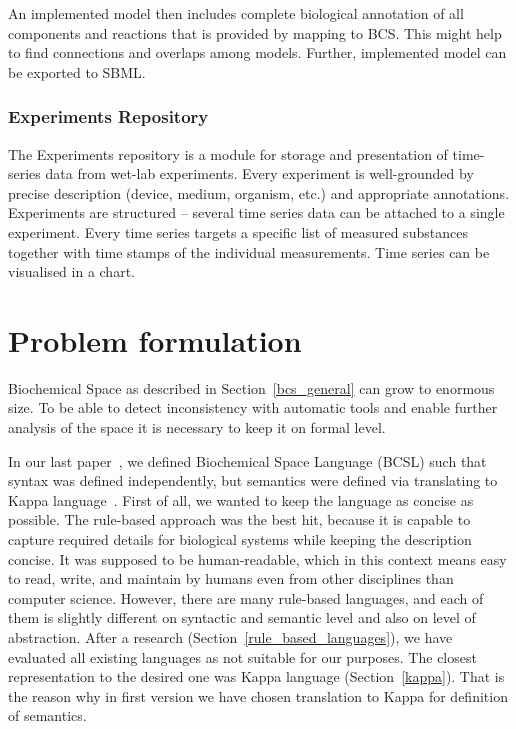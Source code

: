 \documentclass[12pt]{fithesis2}
\begin{document}
An implemented model then includes complete biological annotation of all components and reactions that is provided by mapping to BCS. This might help to find connections and overlaps among models. Further, implemented model can be exported to SBML.

\subsection{Experiments Repository}

The Experiments repository is a module for storage and presentation of time-series data from wet-lab experiments. Every experiment is well-grounded by precise description (device, medium, organism, etc.) and appropriate annotations. Experiments are structured -- several time series data can be attached to a single experiment. Every time series targets a specific list of measured substances together with time stamps of the individual measurements. Time series can be visualised in a chart.	

\chapter{Problem formulation}
\label{problem_formulation}

Biochemical Space as described in Section~\ref{bcs_general} can grow to enormous size. To be able to detect inconsistency with
automatic tools and enable further analysis of the space it is necessary to keep it on formal level.


In our last paper~\cite{Ded201627}, we defined Biochemical Space Language (BCSL) such that syntax was defined independently, but semantics were defined via translating to Kappa language~\cite{kappa_formal}. First of all, we wanted to keep the language as concise as possible. The rule-based approach was the best hit, because it is capable to capture required details for biological systems while keeping the description concise. It was supposed to be human-readable, which in this context means easy to read, write, and maintain by humans even from other disciplines than computer science. However, there are many rule-based languages, and each of them is slightly different on syntactic and semantic level and also on level of abstraction. After a research (Section~\ref{rule_based_languages}), we have evaluated all existing languages as not suitable for our purposes. The closest representation to the desired one was Kappa language (Section~\ref{kappa}). That is the reason why in first version we have chosen translation to Kappa for definition of semantics.
\end{document}
